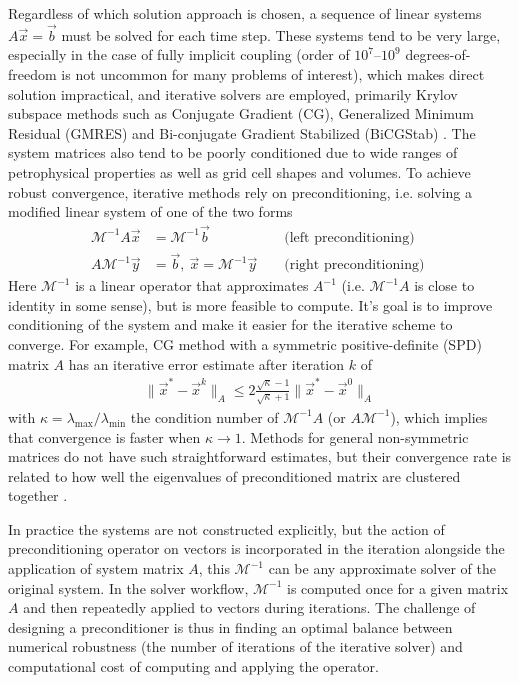 Regardless of which solution approach is chosen, a sequence of linear systems $A \vec{x} = \vec{b}$ must be solved for each time step.   These systems tend to be very large, especially in the case of fully implicit coupling (order of $10^7$--$10^9$ degrees-of-freedom is not uncommon for many problems of interest), which makes direct solution impractical, and iterative solvers are employed, primarily Krylov subspace methods such as Conjugate Gradient (CG), Generalized Minimum Residual (GMRES) and Bi-conjugate Gradient Stabilized (BiCGStab) \cite{Saad2003}.   The system matrices also tend to be poorly conditioned due to wide ranges of petrophysical properties as well as grid cell shapes and volumes.   To achieve robust convergence, iterative methods rely on preconditioning, i.e. solving a modified linear system of one of the two forms
\begin{align}
    \mathcal{M}^{-1}A \vec{x} &= \mathcal{M}^{-1}\vec{b} & & \mbox{ (left preconditioning) } \label{eq:prec_left} \\
    A \mathcal{M}^{-1} \vec{y} &= \vec{b}, \: \vec{x} = \mathcal{M}^{-1} \vec{y} & & \mbox{ (right preconditioning) } \label{eq:prec_right}
\end{align}
Here $\mathcal{M}^{-1}$ is a linear operator that approximates $A^{-1}$ (i.e. $\mathcal{M}^{-1}A$ is close to identity in some sense), but is more feasible to compute.   It's goal is to improve conditioning of the system and make it easier for the iterative scheme to converge.   For example, CG method with a symmetric positive-definite (SPD) matrix $A$ has an iterative error estimate after iteration $k$ of
\begin{align}
    \|\vec{x}^* - \vec{x}^k\|_A \leq 2\frac{\sqrt{\kappa} - 1}{\sqrt{\kappa} + 1} \|\vec{x}^* - \vec{x}^0\|_A
\end{align}
with $\kappa = \lambda_{\max}/\lambda_{\min}$ the condition number of $\mathcal{M}^{-1}A$ (or $A\mathcal{M}^{-1}$), which implies that convergence is faster when $\kappa \to 1$.   Methods for general non-symmetric matrices do not have such straightforward estimates, but their convergence rate is related to how well the eigenvalues of preconditioned matrix are clustered together \cite{Saad2003}.

In practice the systems  are not constructed explicitly, but the action of preconditioning operator on vectors is incorporated in the iteration alongside the application of system matrix $A$, this $\mathcal{M}^{-1}$ can be any approximate solver of the original system.   In the solver workflow, $\mathcal{M}^{-1}$ is computed once for a given matrix $A$ and then repeatedly applied to vectors during iterations.   The challenge of designing a preconditioner is thus in finding an optimal balance between numerical robustness (the number of iterations of the iterative solver) and computational cost of computing and applying the operator.

